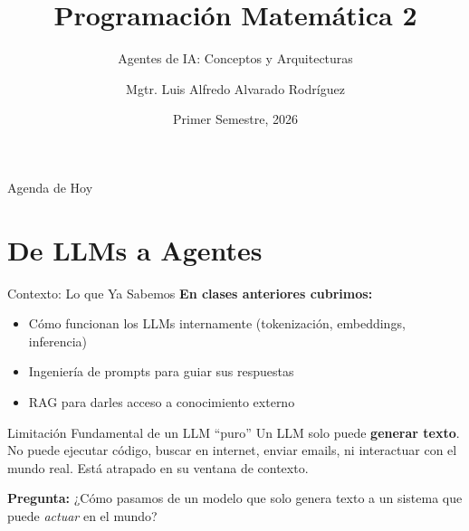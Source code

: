 \documentclass[aspectratio=169]{beamer}
\title[M503]{Programación Matemática 2}
\subtitle{Agentes de IA: Conceptos y Arquitecturas}
\author[Luis Alfredo Alvarado]{Mgtr. Luis Alfredo Alvarado Rodríguez}
\institute[ECFM - USAC]{
    Escuela de Ciencias Físicas y Matemáticas \\
    Universidad de San Carlos de Guatemala
}
\date{Primer Semestre, 2026}
\begin{document}
\begin{frame}
    \titlepage
\end{frame}
\begin{frame}{Agenda de Hoy}
    \tableofcontents
\end{frame}
\section{De LLMs a Agentes}
\begin{frame}{Contexto: Lo que Ya Sabemos}
    \textbf{En clases anteriores cubrimos:}
    \begin{itemize}
        \item Cómo funcionan los LLMs internamente (tokenización, embeddings, inferencia)
        \item Ingeniería de prompts para guiar sus respuestas
        \item RAG para darles acceso a conocimiento externo
    \end{itemize}
    
    \vspace{0.4cm}
    \begin{block}{Limitación Fundamental de un LLM ``puro''}
        Un LLM solo puede \textbf{generar texto}. No puede ejecutar código, buscar en internet, enviar emails, ni interactuar con el mundo real. Está atrapado en su ventana de contexto.
    \end{block}
    
    \vspace{0.3cm}
    \textbf{Pregunta:} ¿Cómo pasamos de un modelo que solo genera texto a un sistema que puede \textit{actuar} en el mundo?
\end{frame}
\end{document}
